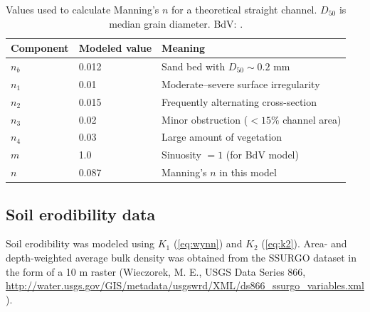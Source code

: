 \documentclass[preprint, review, authoryear, 12pt]{elsarticle}
\begin{document}
\begin{table}
\centering
\begin{tabular}{lll}
\toprule
Component & Modeled value & Meaning\\
\midrule
$n_b$ & 0.012 & Sand bed with $D_{50} \sim 0.2$ mm\\
$n_1$ & 0.01 & Moderate--severe surface irregularity\\
$n_2$ & 0.015& Frequently alternating cross-section\\
$n_3$ & 0.02 & Minor obstruction ($<15\%$ channel area)\\
$n_4$ & 0.03 & Large amount of vegetation\\
$m$ & 1.0 & Sinuosity $=1$ (for BdV model)\\
\midrule
$n$ & 0.087 & Manning's $n$ in this model\\
\bottomrule
\end{tabular}
\caption{Values used to calculate Manning's $n$ for a theoretical straight channel. $D_{50}$ is median grain diameter. BdV: \citet{Blanckaert2010}.}\label{tab:manning}
\end{table}

\subsection{Soil erodibility data}
Soil erodibility was modeled using $K_1$ (\cref{eq:wynn}) and $K_2$ (\cref{eq:k2}). Area- and depth-weighted average bulk density was obtained from the SSURGO dataset in the form of a 10 m raster (Wieczorek, M. E., USGS Data Series 866, \url{http://water.usgs.gov/GIS/metadata/usgswrd/XML/ds866_ssurgo_variables.xml}). 
\end{document}
